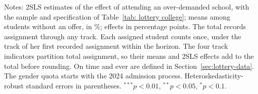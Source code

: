 \begin{table}[htp!]
\singlespacing\renewcommand{\arraystretch}{1.2}
\centering
\caption{{Effect of Attending an Over-Demanded School on College Assignment by Admission Track}}\label{tab: lottery admission tracks}
\small

\par\smallskip
\begin{minipage}{\textwidth}\footnotesize
{Notes: 2SLS estimates of the effect of attending an over-demanded school, with the sample and specification of Table~\ref{tab: lottery college}; means among students without an offer, in \%; effects in percentage points. The total records assignment through any track. Each assigned student counts once, under the track of her first recorded assignment within the horizon. The four track indicators partition total assignment, so their means and 2SLS effects add to the total before rounding. On time and ever are defined in Section~\ref{sec:lottery-data}. The gender quota starts with the 2024 admission process. Heteroskedasticity-robust standard errors in parentheses. $^{***}p<0.01$, $^{**}p<0.05$, $^{*}p<0.1$.}
\end{minipage}
\end{table}

